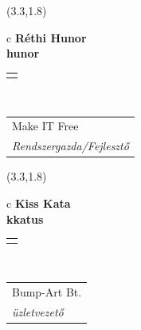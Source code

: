 \documentclass[11pt]{article}
\begin{document}
\makebox(3.3,1.8){
  \renewcommand\arraystretch{1.3}
  \begin{tabular}[c]{c}
    \hspace{8.5mm}
    \LARGE\bf{ Réthi Hunor }\\
    \hspace{8.5mm}
    \Large{ hunor }\\
    \renewcommand\arraystretch{3}
    \begin{tabular}[c]{c}
      \centering
      \fontfamily{phv}\selectfont{
        \textbf{
          \textsc{
            \scriptsize{
            \color{Bright}{ Ismerkedő }\color{Bright}{ Webmester }\color{Bright}{ Sminkmester }\color{Bright}{ Programozó }
            }
          }
        }
      }
    \end{tabular}
    \\
    \renewcommand\arraystretch{1}
    \begin{tabular}{p{3.3in}}
      \hspace{.7cm}Make IT Free\\
      \hspace{.7cm}\emph{ Rendszergazda/Fejlesztő }\\
    \end{tabular}
  \end{tabular}
}

\makebox(3.3,1.8){
  \renewcommand\arraystretch{1.3}
  \begin{tabular}[c]{c}
    \hspace{8.5mm}
    \LARGE\bf{ Kiss Kata }\\
    \hspace{8.5mm}
    \Large{ kkatus }\\
    \renewcommand\arraystretch{3}
    \begin{tabular}[c]{c}
      \centering
      \fontfamily{phv}\selectfont{
        \textbf{
          \textsc{
            \scriptsize{
            \color{Dark}{ Ismerkedő }\color{Bright}{ Webmester }\color{Bright}{ Sminkmester }\color{Bright}{ Programozó }
            }
          }
        }
      }
    \end{tabular}
    \\
    \renewcommand\arraystretch{1}
    \begin{tabular}{p{3.3in}}
      \hspace{.7cm}Bump-Art Bt.\\
      \hspace{.7cm}\emph{ üzletvezető }\\
    \end{tabular}
  \end{tabular}
}
\end{document}
